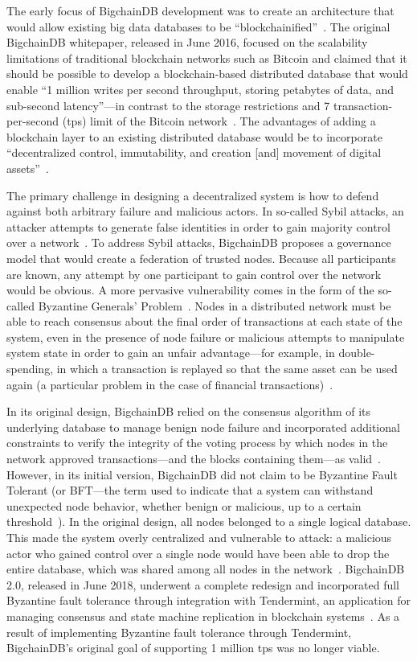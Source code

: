 The early focus of BigchainDB development was to create an
architecture that would allow existing big data databases to be
``blockchainified''~\cite{bigDB16a}. The original BigchainDB whitepaper,
released in June 2016, focused on the scalability limitations of traditional
blockchain networks such as Bitcoin and claimed that it should be possible
to develop a blockchain-based distributed database that would enable ``1
million writes per second throughput, storing petabytes of data, and
sub-second latency''---in contrast to the storage restrictions and 7
transaction-per-second (tps) limit of the Bitcoin network~\cite{bigDB16a}.
The advantages of adding a blockchain layer to an existing distributed
database would be to incorporate ``decentralized control, immutability, and
creation [and] movement of digital assets''~\cite{bigDB16a}. 

The primary challenge in designing a decentralized system is how to
defend against both arbitrary failure and malicious actors. In so-called
Sybil attacks, an attacker attempts to generate false identities in order to
gain majority control over a network~\cite{dJ02}. To address Sybil attacks,
BigchainDB proposes a governance model that would create a federation of
trusted nodes. Because all participants are known, any attempt by one
participant to gain control over the network would be obvious. A more
pervasive vulnerability comes in the form of the so-called Byzantine
Generals' Problem~\cite{bigDB16a}. Nodes in a distributed network must be
able to reach consensus about the final order of transactions at each state
of the system, even in the presence of node failure or malicious attempts to
manipulate system state in order to gain an unfair advantage---for example,
in double-spending, in which a transaction is replayed so that the same
asset can be used again (a particular problem in the case of financial
transactions)~\cite{bigDB16a, aA17}.

In its original design, BigchainDB relied on the consensus algorithm
of its underlying database to manage benign node failure and incorporated
additional constraints to verify the integrity of the voting process by which
nodes in the network approved transactions---and the blocks containing
them---as valid~\cite{bigDB16a}. However, in its initial version, BigchainDB
did not claim to be Byzantine Fault Tolerant (or BFT---the term used to
indicate that a system can withstand unexpected node behavior, whether benign
or malicious, up to a certain threshold~\cite{bigDB16a}). In the original
design, all nodes belonged to a single logical database. This made the system
overly centralized and vulnerable to attack: a malicious actor who gained
control over a single node would have been able to drop the entire database,
which was shared among all nodes in the network~\cite{ks16, bigDB18}.
BigchainDB 2.0, released in June 2018, underwent a complete redesign and
incorporated full Byzantine fault tolerance through integration with
Tendermint, an application for managing consensus and state machine
replication in blockchain systems~\cite{troyM18b, tender18}. As a result of
implementing Byzantine fault tolerance through Tendermint, BigchainDB's
original goal of supporting 1 million tps was no longer viable. 

